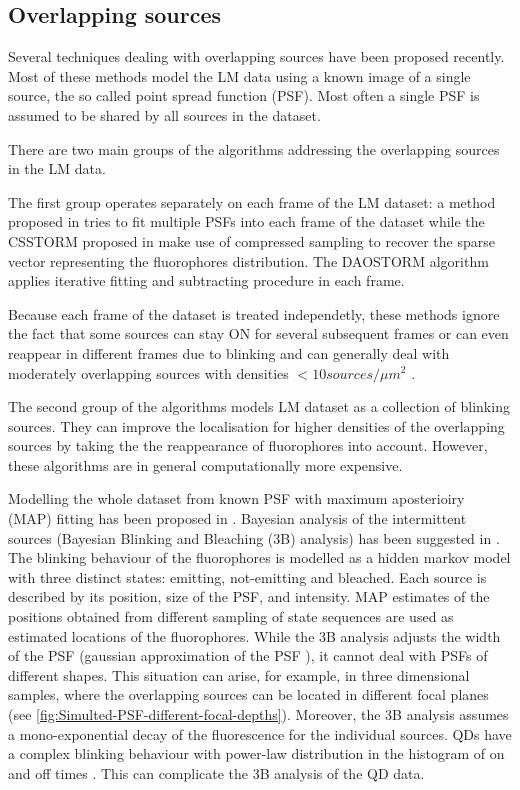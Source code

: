 
\subsection{Overlapping sources\label{sec:Overlapping sources}}

Several techniques dealing with overlapping sources have been proposed recently. Most of these methods model the LM data using a known image of a single source, the so called point spread function (PSF). Most often a single PSF is assumed to be shared by all sources in the dataset.

There are two main groups of the algorithms addressing the overlapping sources in the LM data. 

The first group operates separately on each frame of the LM dataset: a method proposed in \cite{Huang2011} tries to fit multiple PSFs into each frame of the dataset while the CSSTORM proposed in \cite{Zhu2012} make use of compressed sampling to recover the sparse vector representing the fluorophores distribution. The DAOSTORM algorithm \cite{Holden2011} applies iterative fitting and subtracting procedure in each frame. 

Because each frame of the dataset is treated independetly, these methods ignore the fact that some sources can stay ON for several subsequent frames or can even reappear in different frames due to blinking and can generally deal with moderately overlapping sources with densities $<10\unit{sources/\mu m^{2}}$ \cite{Huang2011,Holden2011,Zhu2012}.

The second group of the algorithms models LM dataset as a collection of blinking sources. They can improve the localisation for higher densities of the overlapping sources by taking the the reappearance of fluorophores into account. However, these algorithms are in general computationally more expensive. 

Modelling the whole dataset from known PSF with maximum aposterioiry (MAP) fitting has been proposed in \cite{Harrington2008}. Bayesian analysis of the intermittent sources (Bayesian Blinking and Bleaching (3B) analysis) has been suggested in \cite{Cox2011}. The blinking behaviour of the fluorophores is modelled as a hidden markov model with three distinct states: emitting, not-emitting and bleached. Each source is described by its position, size of the PSF, and intensity. MAP estimates of the positions obtained from different sampling of state sequences are used as estimated locations of the fluorophores. While the 3B analysis adjusts the width of the PSF (gaussian approximation of the PSF \cite{Zhang2007}), it cannot deal with PSFs of different shapes. This situation can arise, for example, in three dimensional samples, where the overlapping sources can be located in different focal planes (see \autoref{fig:Simulted-PSF-different-focal-depths}). Moreover, the 3B analysis assumes a mono-exponential decay of the fluorescence for the individual sources. QDs have a complex blinking behaviour with power-law distribution in the histogram of on and off times \cite{Shimizu2001}. This can complicate the 3B analysis of the QD data. 

